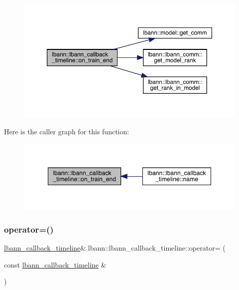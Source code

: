 \begin{figure}[H]
\begin{center}
\leavevmode
\includegraphics[width=350pt]{classlbann_1_1lbann__callback__timeline_a7af247d7f016db358da0a57f8a4b76c6_cgraph}
\end{center}
\end{figure}
Here is the caller graph for this function\+:\nopagebreak
\begin{figure}[H]
\begin{center}
\leavevmode
\includegraphics[width=348pt]{classlbann_1_1lbann__callback__timeline_a7af247d7f016db358da0a57f8a4b76c6_icgraph}
\end{center}
\end{figure}
\mbox{\label{classlbann_1_1lbann__callback__timeline_a8469e5e1a36d8ed022b803a895baa6f8}} 
\subsubsection{\texorpdfstring{operator=()}{operator=()}}
{\footnotesize\ttfamily \hyperlink{classlbann_1_1lbann__callback__timeline}{lbann\+\_\+callback\+\_\+timeline}\& lbann\+::lbann\+\_\+callback\+\_\+timeline\+::operator= (\begin{DoxyParamCaption}\item[{const \hyperlink{classlbann_1_1lbann__callback__timeline}{lbann\+\_\+callback\+\_\+timeline} \&}]{ }\end{DoxyParamCaption})\hspace{0.3cm}{\ttfamily [default]}}

